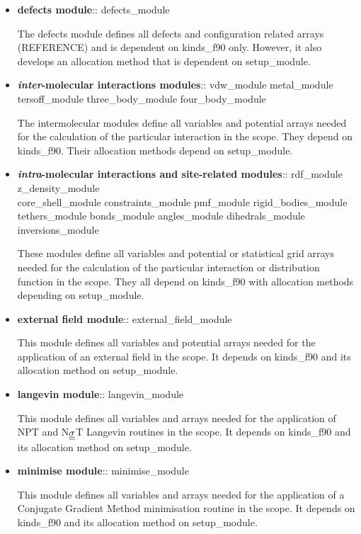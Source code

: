 \begin{itemize}
\item {\bf defects module}:: {\sc defects\_module}

The defects module defines all defects and configuration related
arrays (REFERENCE) and is dependent on {\sc kinds\_f90} only.
However, it also develops an allocation method that is dependent
on {\sc setup\_module}.

\item {\bf {\em inter}-molecular interactions modules}:: {\sc
vdw\_module metal\_module \\
tersoff\_module three\_body\_module four\_body\_module}

The intermolecular modules define all variables and potential
arrays needed for the calculation of the particular interaction in
the \D scope.  They depend on {\sc kinds\_f90}.  Their allocation
methods depend on {\sc setup\_module}.

\item {\bf {\em intra}-molecular interactions and site-related
modules}:: {\sc rdf\_module z\_density\_module \\ core\_shell\_module
constraints\_module pmf\_module rigid\_bodies\_module \\ tethers\_module
bonds\_module angles\_module dihedrals\_module inversions\_module}

These modules define all variables and potential or statistical
grid arrays needed for the calculation of the particular interaction
or distribution function in the \D scope.  They all depend on {\sc kinds\_f90}
with allocation methods depending on {\sc setup\_module}.

\item {\bf external field module}:: {\sc external\_field\_module}

This module defines all variables and potential arrays needed for
the application of an external field in the \D scope.  It depends
on {\sc kinds\_f90} and its allocation method on {\sc setup\_module}.

\item {\bf langevin module}:: {\sc langevin\_module}

This module defines all variables and arrays needed for the
application of NPT and N$\mbox{$\underline{\underline{\bf \sigma}}$}$T Langevin routines
in the \D scope.  It depends on {\sc kinds\_f90} and its
allocation method on {\sc setup\_module}.

\item {\bf minimise module}:: {\sc minimise\_module}

This module defines all variables and arrays needed for the
application of a Conjugate Gradient Method minimisation routine
in the \D scope.  It depends on {\sc kinds\_f90} and its
allocation method on {\sc setup\_module}.


\end{itemize}

